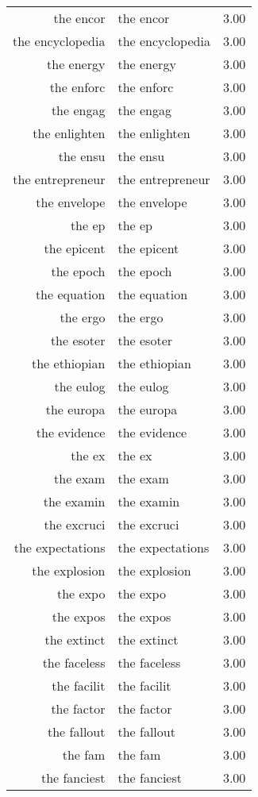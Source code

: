 \begin{table}[ht]
\begin{tabular}{rlr}
  the encor & the encor & 3.00 \\ 
  the encyclopedia & the encyclopedia & 3.00 \\ 
  the energy & the energy & 3.00 \\ 
  the enforc & the enforc & 3.00 \\ 
  the engag & the engag & 3.00 \\ 
  the enlighten & the enlighten & 3.00 \\ 
  the ensu & the ensu & 3.00 \\ 
  the entrepreneur & the entrepreneur & 3.00 \\ 
  the envelope & the envelope & 3.00 \\ 
  the ep & the ep & 3.00 \\ 
  the epicent & the epicent & 3.00 \\ 
  the epoch & the epoch & 3.00 \\ 
  the equation & the equation & 3.00 \\ 
  the ergo & the ergo & 3.00 \\ 
  the esoter & the esoter & 3.00 \\ 
  the ethiopian & the ethiopian & 3.00 \\ 
  the eulog & the eulog & 3.00 \\ 
  the europa & the europa & 3.00 \\ 
  the evidence & the evidence & 3.00 \\ 
  the ex & the ex & 3.00 \\ 
  the exam & the exam & 3.00 \\ 
  the examin & the examin & 3.00 \\ 
  the excruci & the excruci & 3.00 \\ 
  the expectations & the expectations & 3.00 \\ 
  the explosion & the explosion & 3.00 \\ 
  the expo & the expo & 3.00 \\ 
  the expos & the expos & 3.00 \\ 
  the extinct & the extinct & 3.00 \\ 
  the faceless & the faceless & 3.00 \\ 
  the facilit & the facilit & 3.00 \\ 
  the factor & the factor & 3.00 \\ 
  the fallout & the fallout & 3.00 \\ 
  the fam & the fam & 3.00 \\ 
  the fanciest & the fanciest & 3.00 \\ 

\end{tabular}
\end{table}
